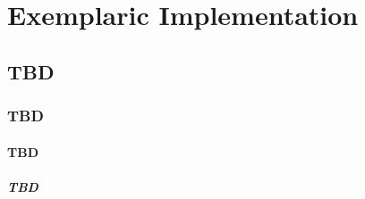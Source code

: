 \chapter{Exemplaric Implementation}

\section{TBD}

\subsection{TBD}

\subsubsection{TBD}
 
\paragraph{TBD}